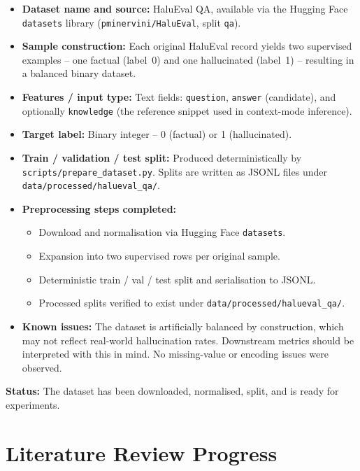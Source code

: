 \documentclass[12pt,a4paper]{article}
\begin{document}
\begin{itemize}
  \item \textbf{Dataset name and source:} HaluEval QA, available via the Hugging Face \texttt{datasets} library (\texttt{pminervini/HaluEval}, split \texttt{qa}).
  \item \textbf{Sample construction:} Each original HaluEval record yields two supervised examples -- one factual (label~0) and one hallucinated (label~1) -- resulting in a balanced binary dataset.
  \item \textbf{Features / input type:} Text fields: \texttt{question}, \texttt{answer} (candidate), and optionally \texttt{knowledge} (the reference snippet used in context-mode inference).
  \item \textbf{Target label:} Binary integer -- 0 (factual) or 1 (hallucinated).
  \item \textbf{Train / validation / test split:} Produced deterministically by \texttt{scripts/prepare\_dataset.py}. Splits are written as JSONL files under \texttt{data/processed/halueval\_qa/}.
  \item \textbf{Preprocessing steps completed:}
    \begin{itemize}
      \item Download and normalisation via Hugging Face \texttt{datasets}.
      \item Expansion into two supervised rows per original sample.
      \item Deterministic train / val / test split and serialisation to JSONL.
      \item Processed splits verified to exist under \texttt{data/processed/halueval\_qa/}.
    \end{itemize}
  \item \textbf{Known issues:} The dataset is artificially balanced by construction, which may not reflect real-world hallucination rates. Downstream metrics should be interpreted with this in mind. No missing-value or encoding issues were observed.
\end{itemize}

\textbf{Status:} The dataset has been downloaded, normalised, split, and is ready for experiments.

\section{Literature Review Progress}
\end{document}
